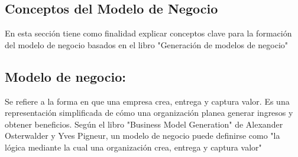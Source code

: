 \subsection{Conceptos del Modelo de Negocio}

En esta sección tiene como finalidad explicar conceptos clave para la formación del modelo de negocio basados en el libro "Generación de modelos de negocio"\cite{modeloNegocio}

\subsection{Modelo de negocio: }

Se refiere a la forma en que una empresa crea, entrega y captura valor. Es una representación simplificada de cómo una organización planea generar ingresos y obtener beneficios. Según el libro "Business Model Generation" de Alexander Osterwalder y Yves Pigneur, un modelo de negocio puede definirse como "la lógica mediante la cual una organización crea, entrega y captura valor" \cite{modeloNegocio}

